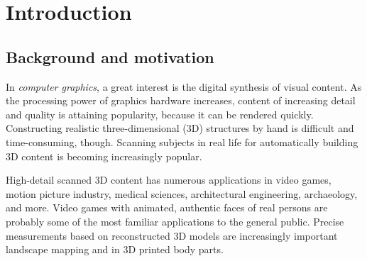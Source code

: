 \section{Introduction}



\thispagestyle{empty}

\subsection{Background and motivation}


In \emph{computer graphics}, a great interest is the digital synthesis of visual content.
As the processing power of graphics hardware increases, content of increasing detail and quality is attaining popularity, because it can be rendered quickly.
Constructing realistic three-dimensional (3D) structures by hand is difficult and time-consuming, though.
Scanning subjects in real life for automatically building 3D content is becoming increasingly popular.


High-detail scanned 3D content has numerous applications in video games, motion picture industry, medical sciences, architectural engineering, archaeology, and more.
Video games with animated, authentic faces of real persons are probably some of the most familiar applications to the general public.
Precise measurements based on reconstructed 3D models are increasingly important landscape mapping and in 3D printed body parts.

